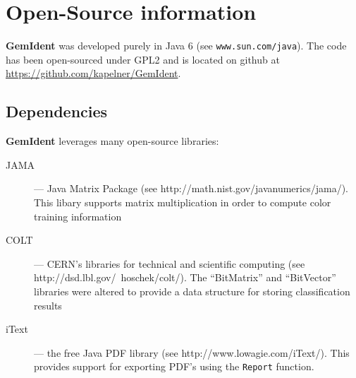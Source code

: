 \documentclass[12pt]{article}
\begin{document}
\section{Open-Source information\label{open_source}}

{\bf GemIdent} was developed purely in Java 6 (see {\tt www.sun.com/java}). The code has been open-sourced under GPL2 and is located on github at \url{https://github.com/kapelner/GemIdent}.

\subsection*{Dependencies}

{\bf GemIdent} leverages many open-source libraries:
\begin{description}
\item[JAMA] --- Java Matrix Package (see http://math.nist.gov/javanumerics/jama/). This libary supports matrix multiplication in order to compute color training information
\item[COLT] --- CERN's libraries for technical and scientific computing (see http://dsd.lbl.gov/~hoschek/colt/). The ``BitMatrix'' and ``BitVector'' libraries were altered to provide a data structure for storing classification results
\item[iText] --- the free Java PDF library (see http://www.lowagie.com/iText/). This provides support for exporting PDF's using the {\tt Report} function.
\end{description}
\end{document}
